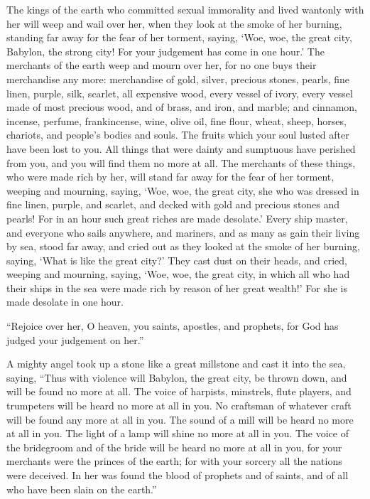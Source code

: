  The kings of the earth who committed sexual immorality and
lived wantonly with her will weep and wail over her, when they look at
the smoke of her burning,  standing far away for the fear
of her torment, saying, `Woe, woe, the great city, Babylon, the strong
city! For your judgement has come in one hour.'  The
merchants of the earth weep and mourn over her, for no one buys their
merchandise any more:  merchandise of gold, silver,
precious stones, pearls, fine linen, purple, silk, scarlet, all
expensive wood, every vessel of ivory, every vessel made of most
precious wood, and of brass, and iron, and marble;  and
cinnamon, incense, perfume, frankincense, wine, olive oil, fine flour,
wheat, sheep, horses, chariots, and people's bodies and souls.
 The fruits which your soul lusted after have been lost to
you. All things that were dainty and sumptuous have perished from you,
and you will find them no more at all.  The merchants of
these things, who were made rich by her, will stand far away for the
fear of her torment, weeping and mourning,  saying, `Woe,
woe, the great city, she who was dressed in fine linen, purple, and
scarlet, and decked with gold and precious stones and pearls!
 For in an hour such great riches are made desolate.' Every
ship master, and everyone who sails anywhere, and mariners, and as many
as gain their living by sea, stood far away,  and cried out
as they looked at the smoke of her burning, saying, `What is like the
great city?'  They cast dust on their heads, and cried,
weeping and mourning, saying, `Woe, woe, the great city, in which all
who had their ships in the sea were made rich by reason of her great
wealth!' For she is made desolate in one hour.

 ``Rejoice over her, O heaven, you saints, apostles, and
prophets, for God has judged your judgement on her.''

 A mighty angel took up a stone like a great millstone and
cast it into the sea, saying, ``Thus with violence will Babylon, the
great city, be thrown down, and will be found no more at all.
 The voice of harpists, minstrels, flute players, and
trumpeters will be heard no more at all in you. No craftsman of whatever
craft will be found any more at all in you. The sound of a mill will be
heard no more at all in you.  The light of a lamp will
shine no more at all in you. The voice of the bridegroom and of the
bride will be heard no more at all in you, for your merchants were the
princes of the earth; for with your sorcery all the nations were
deceived.  In her was found the blood of prophets and of
saints, and of all who have been slain on the earth.''

